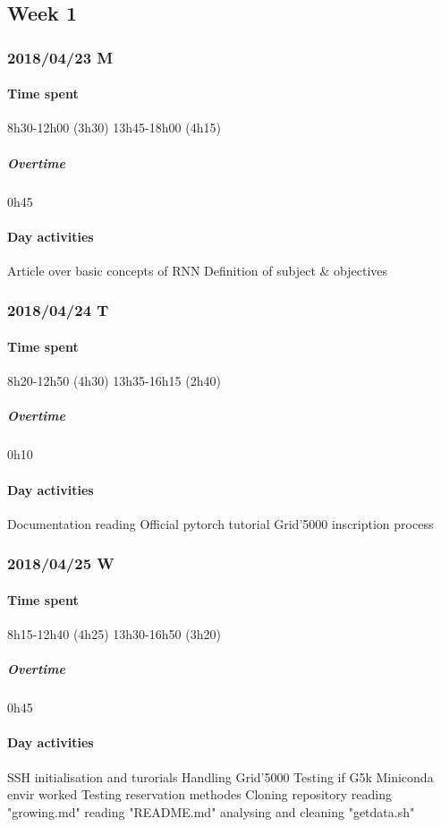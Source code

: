 \subsection{Week 1}
\subsubsection{2018/04/23 M}
\paragraph{Time spent}
{8h30}-{12h00} (3h30)
{13h45}-{18h00} (4h15)

\subparagraph{Overtime}
0h45

\paragraph{Day activities}
Article over basic concepts of RNN
Definition of subject \& objectives

\subsubsection{2018/04/24 T}
\paragraph{Time spent}
{8h20}-{12h50} (4h30)
{13h35}-{16h15} (2h40) 

\subparagraph{Overtime}
0h10

\paragraph{Day activities}
Documentation reading
Official pytorch tutorial
Grid'5000 inscription process

\subsubsection{2018/04/25 W}
\paragraph{Time spent}
{8h15}-{12h40} (4h25)
{13h30}-{16h50} (3h20) 

\subparagraph{Overtime}
0h45

\paragraph{Day activities}
SSH initialisation and turorials
Handling Grid'5000
Testing if G5k Miniconda envir worked
Testing reservation methodes
Cloning repository
reading "growing.md"
reading "README.md"
analysing and cleaning "getdata.sh"

